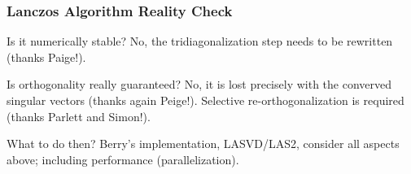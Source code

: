 \begin{frame}[plain]
	\frametitle{Lanczos Algorithm Reality Check}
	\begin{block}{Is it numerically stable?}
    No, the tridiagonalization step needs to be rewritten (thanks Paige!).
	\end{block}   
	\begin{block}{Is orthogonality really guaranteed?}
    No, it is lost precisely with the converved singular vectors
    (thanks again Peige!). Selective re-orthogonalization is required
    (thanks Parlett and Simon!).
	\end{block}
	\begin{block}{What to do then?}
    Berry's implementation, LASVD/LAS2, consider all aspects above;
    including performance (parallelization). 
	\end{block}
\end{frame}
